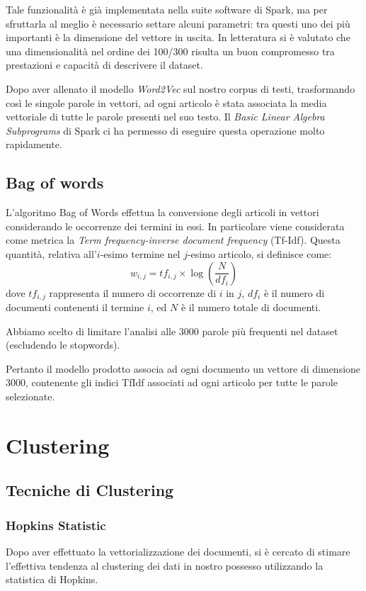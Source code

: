 \documentclass[
	11pt, %
	a4paper, %
	oneside, %
	headinclude,footinclude, %
	BCOR5mm, %
]{scrartcl}
\begin{document}
		Tale funzionalità è già implementata nella suite software di Spark, ma per sfruttarla al meglio è necessario settare alcuni parametri: tra questi uno dei più importanti è la dimensione del vettore in uscita.
		In letteratura si è valutato che una dimensionalità nel ordine dei 100/300\cite{w2vdim} risulta un buon compromesso tra prestazioni e capacità di descrivere il dataset.

		Dopo aver allenato il modello \emph{Word2Vec} sul nostro corpus di testi, trasformando così le singole parole in vettori, ad ogni articolo è stata associata la media vettoriale di tutte le parole presenti nel suo testo. Il \emph{Basic Linear Algebra Subprograms} di Spark ci ha permesso di eseguire questa operazione molto rapidamente.

	\subsection{Bag of words} \label{sec:bag_of_words}

	L'algoritmo Bag of Words\cite{bagofwords} effettua la conversione degli articoli in vettori considerando le occorrenze dei termini in essi.
	In particolare viene considerata come metrica la \textit{Term frequency-inverse document frequency} (Tf-Idf).
	Questa quantità, relativa all'$i$-esimo termine nel $j$-esimo articolo, si definisce come:
	$$ w_{i,j}=tf_{i,j}\times\log \left(\frac{N}{df_{i}} \right) $$
	dove $tf_{i,j}$ rappresenta il numero di occorrenze di $i$ in $j$, $df_{i}$ è il numero di documenti contenenti il termine $i$, ed $N$ è il numero totale di documenti.

	Abbiamo scelto di limitare l'analisi alle 3000 parole più frequenti nel dataset (escludendo le stopwords).

	Pertanto il modello prodotto associa ad ogni documento un vettore di dimensione 3000, contenente gli indici TfIdf associati ad ogni articolo per tutte le parole selezionate.

\section{Clustering} \label{sec:clustering}

	\subsection{Tecniche di Clustering}

		\subsubsection{Hopkins Statistic}
			Dopo aver effettuato la vettorializzazione dei documenti, si è cercato di stimare l'effettiva tendenza al clustering dei dati in nostro possesso utilizzando la statistica di Hopkins\cite{hopkins}.
			
\end{document}

